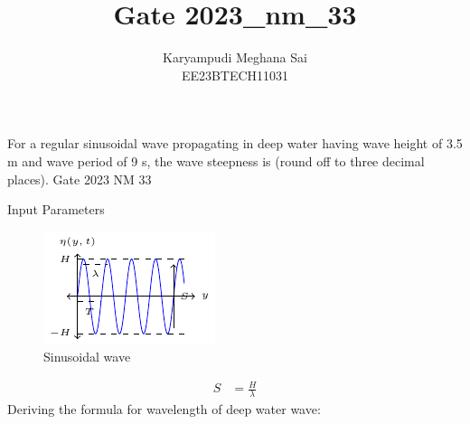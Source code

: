 \documentclass[journal,12pt,onecolumn]{IEEEtran}
\theoremstyle{remark}
\begin{document}
\let\vec\mathbf







\bigskip


\title{Gate 2023\_nm\_33}
\author{Karyampudi Meghana Sai\\ EE23BTECH11031}

\maketitle

For a regular sinusoidal wave propagating in deep water having wave height of 3.5 m and wave period of 9 s, the wave steepness is \underline{\hspace{1cm}} (round off to three decimal places).
\hfill Gate 2023 NM 33

\solution

\begin{table}[h]
 	\centering
 	\resizebox{6 cm}{!}{
 		
 	}
 	\vspace{6 pt}
 	\caption{Input Parameters}
 	\label{} 
 \end{table} 
 
 \begin{figure}[h!]
    \centering
    \includegraphics[width=\columnwidth]{figs/figs1.pdf}
    \caption{Sinusoidal wave}
    \label{fig:}
\end{figure} 

\begin{align}
S&=\frac{H}{\lambda} \label{eq:gatenm33eq1}
\end{align}
 Deriving the formula for wavelength of deep water wave:\\
\end{document}
